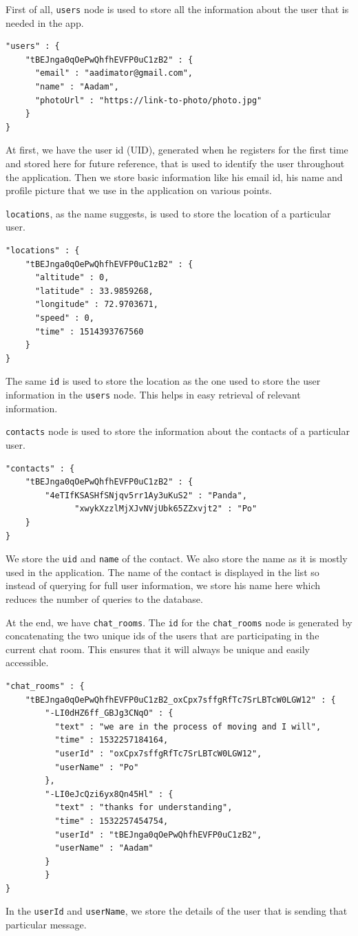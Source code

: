 First of all, \texttt{users} node is used to store all the information about the user that is needed in the app.
\begin{verbatim}
"users" : {
    "tBEJnga0qOePwQhfhEVFP0uC1zB2" : {
      "email" : "aadimator@gmail.com",
      "name" : "Aadam",
      "photoUrl" : "https://link-to-photo/photo.jpg"
    }
}
\end{verbatim}
At first, we have the user id (UID), generated when he registers for the first time and stored here for future reference, that is used to identify the user throughout the application. Then we store basic information like his email id, his name and profile picture that we use in the application on various points.

\texttt{locations}, as the name suggests, is used to store the location of a particular user. 
\begin{verbatim}
"locations" : {
    "tBEJnga0qOePwQhfhEVFP0uC1zB2" : {
      "altitude" : 0,
      "latitude" : 33.9859268,
      "longitude" : 72.9703671,
      "speed" : 0,
      "time" : 1514393767560
    }
}
\end{verbatim}
The same \texttt{id} is used to store the location as the one used to store the user information in the \texttt{users} node. This helps in easy retrieval of relevant information.

\texttt{contacts} node is used to store the information about the contacts of a particular user.
\begin{verbatim}
"contacts" : {
    "tBEJnga0qOePwQhfhEVFP0uC1zB2" : {
        "4eTIfKSASHfSNjqv5rr1Ay3uKuS2" : "Panda",
              "xwykXzzlMjXJvNVjUbk65ZZxvjt2" : "Po"
    }
}
\end{verbatim}
We store the \texttt{uid} and \texttt{name} of the contact. We also store the name as it is mostly used in the application. The name of the contact is displayed in the list so instead of querying for full user information, we store his name here which reduces the number of queries to the database.

At the end, we have \texttt{chat\_rooms}. The \texttt{id} for the \texttt{chat\_rooms} node is generated by concatenating the two unique ids of the users that are participating in the current chat room. This ensures that it will always be unique and easily accessible.
\begin{verbatim}
"chat_rooms" : {
    "tBEJnga0qOePwQhfhEVFP0uC1zB2_oxCpx7sffgRfTc7SrLBTcW0LGW12" : {
        "-LI0dHZ6ff_GBJg3CNqO" : {
          "text" : "we are in the process of moving and I will",
          "time" : 1532257184164,
          "userId" : "oxCpx7sffgRfTc7SrLBTcW0LGW12",
          "userName" : "Po"
        },
        "-LI0eJcQzi6yx8Qn45Hl" : {
          "text" : "thanks for understanding",
          "time" : 1532257454754,
          "userId" : "tBEJnga0qOePwQhfhEVFP0uC1zB2",
          "userName" : "Aadam"
        }
        }
}
\end{verbatim}
In the \texttt{userId} and \texttt{userName}, we store the details of the user that is sending that particular message.

